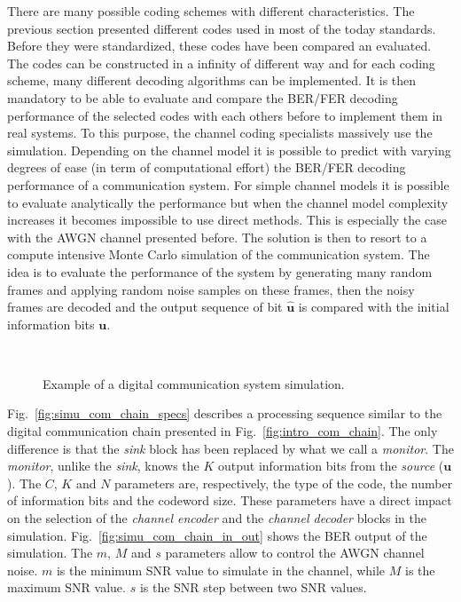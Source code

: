 There are many possible coding schemes with different characteristics. The
previous section presented different codes used in most of the today standards.
Before they were standardized, these codes have been compared an evaluated.
The codes can be constructed in a infinity of different way and for each coding
scheme, many different decoding algorithms can be implemented. It is then
mandatory to be able to evaluate and compare the BER/FER decoding performance of
the selected codes with each others before to implement them in real systems. To
this purpose, the channel coding specialists massively use the simulation.
Depending on the channel model it is possible to predict with varying degrees of
ease (in term of computational effort) the BER/FER decoding performance of a
communication system. For simple channel models it is possible to evaluate
analytically the performance but when the channel model complexity increases it
becomes impossible to use direct methods. This is especially the case with the
AWGN channel presented before. The solution is then to resort to a compute
intensive Monte Carlo simulation of the communication system. The idea is to
evaluate the performance of the system by generating many random frames and
applying random noise samples on these frames, then the noisy frames are decoded
and the output sequence of bit $\bm{\hat{u}}$ is compared with the initial
information bits $\bm{u}$.

\begin{figure}[htp]
  \centering
  \\
  \caption{Example of a digital communication system simulation.}
  \label{fig:simu_com_chain}
\end{figure}

Fig.~\ref{fig:simu_com_chain_specs} describes a processing sequence similar
to the digital communication chain presented in Fig.~\ref{fig:intro_com_chain}.
The only difference is that the \emph{sink} block has been replaced by what we
call a \emph{monitor}. The \emph{monitor}, unlike the \emph{sink}, knows the $K$
output information bits from the \emph{source} ($\bm{u}$). The $C$, $K$ and $N$
parameters are, respectively, the type of the code, the number of information
bits and the codeword size. These parameters have a direct impact on the
selection of the \emph{channel encoder} and the \emph{channel decoder} blocks
in the simulation. Fig.~\ref{fig:simu_com_chain_in_out} shows the BER output of
the simulation. The $m$, $M$ and $s$ parameters allow to control the AWGN
channel noise. $m$ is the minimum SNR value to simulate in the channel, while
$M$ is the maximum SNR value. $s$ is the SNR step between two SNR values.

